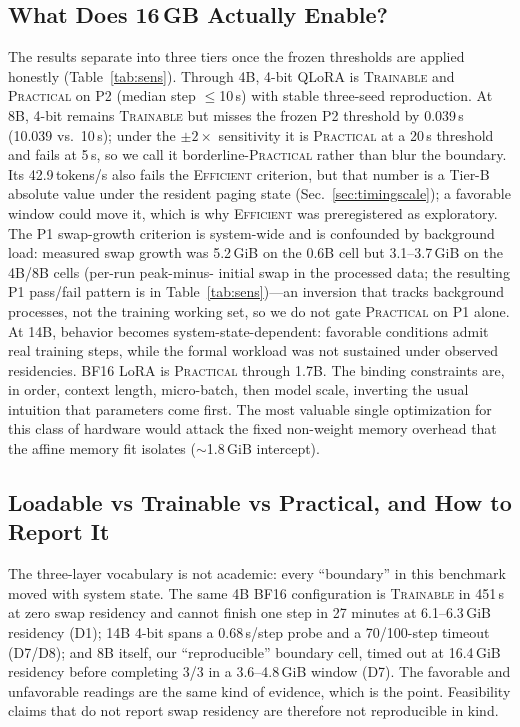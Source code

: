 \documentclass[10pt,twocolumn]{article}
\newcommand{\trainable}{\textsc{Trainable}\xspace}
\newcommand{\practical}{\textsc{Practical}\xspace}
\newcommand{\efficient}{\textsc{Efficient}\xspace}
\begin{document}
\subsection{What Does 16\,GB Actually Enable?}
\label{sec:whatenable}
The results separate into three tiers once the frozen thresholds are
applied honestly (Table~\ref{tab:sens}). Through 4B, 4-bit QLoRA is
\trainable and \practical on P2 (median step $\le$10\,s) with stable
three-seed reproduction. At 8B, 4-bit remains \trainable but misses
the frozen P2 threshold by 0.039\,s (10.039 vs.\ 10\,s); under the
$\pm2\times$ sensitivity it is \practical{} at a 20\,s threshold and
fails at 5\,s, so we call it borderline-\practical{} rather than blur
the boundary. Its 42.9\,tokens/s also fails the \efficient{}
criterion, but that number is a Tier-B absolute value under the
resident paging state (Sec.~\ref{sec:timingscale}); a favorable window
could move it, which is why \efficient{} was preregistered as
exploratory. The P1 swap-growth criterion is system-wide and is
confounded by background load: measured swap growth was 5.2\,GiB on
the 0.6B cell but 3.1--3.7\,GiB on the 4B/8B cells (per-run peak-minus-
initial swap in the processed data; the resulting P1 pass/fail pattern
is in Table~\ref{tab:sens})---an inversion that tracks background
processes, not the training working set, so we do not gate \practical{}
on P1 alone. At 14B, behavior becomes
system-state-dependent: favorable conditions admit real training
steps, while the formal workload was not sustained under observed
residencies. BF16 LoRA is \practical through 1.7B. The binding
constraints are, in order, context length, micro-batch, then model
scale, inverting the usual intuition that parameters come first. The
most valuable single optimization for this class of hardware would
attack the fixed non-weight memory overhead that the affine memory fit
isolates ($\sim$1.8\,GiB intercept).

\subsection{Loadable vs Trainable vs Practical, and How to Report It}
The three-layer vocabulary is not academic: every ``boundary'' in this
benchmark moved with system state. The same 4B BF16 configuration is
\trainable in 451\,s at zero swap residency and cannot finish one step
in 27 minutes at 6.1--6.3\,GiB residency (D1); 14B 4-bit spans a
0.68\,s/step probe and a 70/100-step timeout (D7/D8); and 8B itself,
our ``reproducible'' boundary cell, timed out at 16.4\,GiB residency
before completing 3/3 in a 3.6--4.8\,GiB window (D7). The favorable
and unfavorable readings are the same kind of evidence, which is the
point. Feasibility claims that do not report swap residency are
therefore not reproducible in kind.
\end{document}
